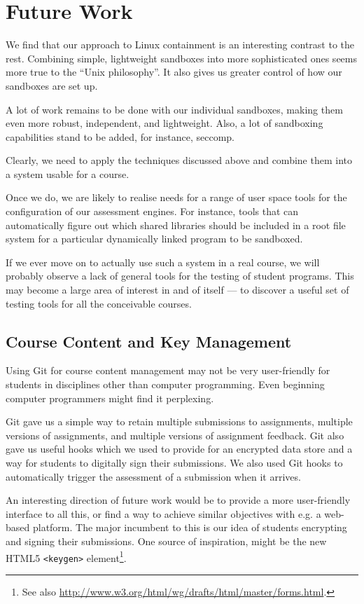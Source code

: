 
\section{Future Work}

We find that our approach to Linux containment is an interesting contrast to
the rest. Combining simple, lightweight sandboxes into more sophisticated ones
seems more true to the ``Unix philosophy''. It also gives us greater control of
how our sandboxes are set up.

A lot of work remains to be done with our individual sandboxes, making them
even more robust, independent, and lightweight. Also, a lot of sandboxing
capabilities stand to be added, for instance, seccomp.

Clearly, we need to apply the techniques discussed above and combine them into
a system usable for a course.

Once we do, we are likely to realise needs for a range of user space tools for
the configuration of our assessment engines. For instance, tools that can
automatically figure out which shared libraries should be included in a root
file system for a particular dynamically linked program to be sandboxed.

If we ever move on to actually use such a system in a real course, we will
probably observe a lack of general tools for the testing of student programs.
This may become a large area of interest in and of itself --- to discover a
useful set of testing tools for all the conceivable courses.

\subsection{Course Content and Key Management}

Using Git for course content management may not be very user-friendly for
students in disciplines other than computer programming. Even beginning
computer programmers might find it perplexing.

Git gave us a simple way to retain multiple submissions to assignments,
multiple versions of assignments, and multiple versions of assignment feedback.
Git also gave us useful hooks which we used to provide for an encrypted data
store and a way for students to digitally sign their submissions. We also used
Git hooks to automatically trigger the assessment of a submission when it
arrives.

An interesting direction of future work would be to provide a more
user-friendly interface to all this, or find a way to achieve similar
objectives with e.g. a web-based platform. The major incumbent to this is our
idea of students encrypting and signing their submissions. One source of
inspiration, might be the new HTML5 \texttt{<keygen>} element\footnote{See also
\url{http://www.w3.org/html/wg/drafts/html/master/forms.html}.}.
